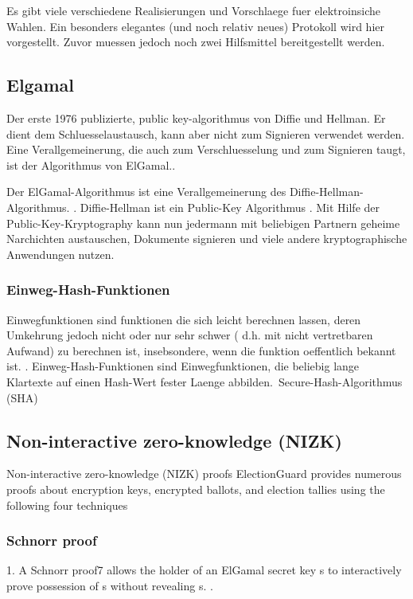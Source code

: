 Es gibt viele verschiedene Realisierungen und Vorschlaege fuer elektroinsiche Wahlen. Ein besonders elegantes (und noch relativ neues) Protokoll wird
hier vorgestellt. Zuvor muessen jedoch noch zwei Hilfsmittel bereitgestellt werden.

\subsection{Elgamal}
Der erste 1976 publizierte, public key-algorithmus von Diffie und Hellman. Er dient dem Schluesselaustausch, kann aber nicht zum Signieren verwendet werden.
Eine Verallgemeinerung, die auch zum Verschluesselung und zum Signieren taugt, ist der Algorithmus von ElGamal.\cite[78]{crypto}.


\cite[78]{crypto}

Der ElGamal-Algorithmus ist eine Verallgemeinerung des Diffie-Hellman-Algorithmus. \cite[95]{crypto}.
Diffie-Hellman ist ein Public-Key Algorithmus \cite[94]{crypto}. Mit Hilfe der Public-Key-Kryptography kann nun jedermann mit beliebigen Partnern geheime Narchichten austauschen, Dokumente signieren und viele andere kryptographische Anwendungen nutzen.\cite[22]{crypto}

\subsubsection{Einweg-Hash-Funktionen}
Einwegfunktionen sind funktionen die sich leicht berechnen lassen, deren Umkehrung jedoch nicht oder nur sehr schwer (
d.h. mit
nicht
vertretbaren Aufwand) zu berechnen ist, insebsondere, wenn die funktion oeffentlich bekannt ist. \cite[100]{crypto}.
Einweg-Hash-Funktionen sind Einwegfunktionen, die beliebig lange Klartexte auf einen Hash-Wert fester Laenge abbilden.\
Secure-Hash-Algorithmus (SHA)

\subsection{Non-interactive zero-knowledge (NIZK)}
Non-interactive zero-knowledge (NIZK) proofs ElectionGuard provides numerous proofs about encryption keys, encrypted
ballots, and election tallies using the following four techniques \cite[6]{eg-spec}
\subsubsection{Schnorr proof}
1. A Schnorr proof7 allows the holder of an ElGamal
secret key s to interactively prove possession of s without revealing s. \cite[6]{eg-spec}.
